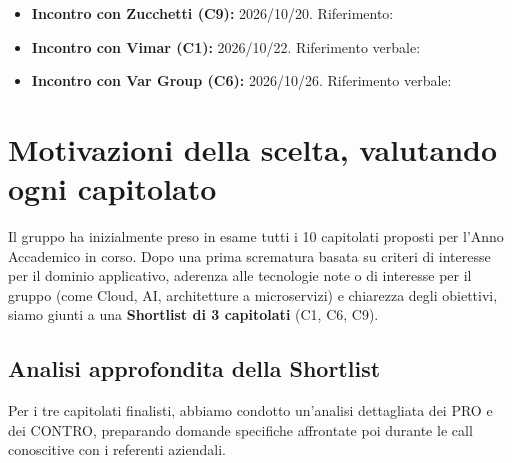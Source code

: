 \documentclass[a4paper, 11pt]{article}
\begin{document}
\begin{itemize}
    \item \textbf{Incontro con Zucchetti (C9):} 2026/10/20. Riferimento: 
    \item \textbf{Incontro con Vimar (C1):} 2026/10/22. Riferimento verbale: 
    \item \textbf{Incontro con Var Group (C6):} 2026/10/26. Riferimento verbale: 
\end{itemize}

\section{Motivazioni della scelta, valutando ogni capitolato}

Il gruppo ha inizialmente preso in esame tutti i 10 capitolati proposti per l'Anno Accademico in corso. Dopo una prima scrematura basata su criteri di interesse per il dominio applicativo, aderenza alle tecnologie note o di interesse per il gruppo (come Cloud, AI, architetture a microservizi) e chiarezza degli obiettivi, siamo giunti a una \textbf{Shortlist di 3 capitolati} (C1, C6, C9).

\subsection{Analisi approfondita della Shortlist}

Per i tre capitolati finalisti, abbiamo condotto un'analisi dettagliata dei PRO e dei CONTRO, preparando domande specifiche affrontate poi durante le call conoscitive con i referenti aziendali.
\end{document}
